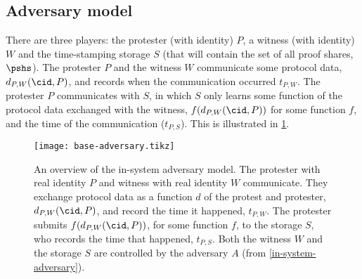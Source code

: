 \subsection{Adversary model}%
\label{formal-adversary-model}


There are three players: the protester (with identity) \(P\), a witness (with 
identity) \(W\) and the time-stamping storage \(S\) (that will contain the set 
of all proof shares, \(\pshs\)).
The protester \(P\) and the witness \(W\) communicate some protocol data,
\(d_{P,W}(\cid, P)\), and records when the communication occurred \(t_{P,W}\).
The protester \(P\) communicates with \(S\), in which \(S\) only learns some 
function of the protocol data exchanged with the witness, \(f(d_{P,W}(\cid, 
  P))\) for some function \(f\), and the time of the communication 
(\(t_{P,S}\)).
This is illustrated in \cref{fig:base-adversary}.

\begin{figure}
  \centering
  \texttt{[image: base-adversary.tikz]}
  \caption{\label{fig:base-adversary}%
    An overview of the in-system adversary model.
    The protester with real identity \(P\) and witness with real identity \(W\) 
    communicate.
    They exchange protocol data as a function \(d\) of the protest and protester, \(d_{P,W}(\cid, P)\), and record the time it 
    happened, \(t_{P,W}\).
    The protester submits \(f(d_{P,W}(\cid, P))\), for some function \(f\), to 
    the storage \(S\), who records the time that happened, \(t_{P,S}\).
    Both the witness \(W\) and the storage \(S\) are controlled by the adversary 
    \(A\) (from \cref{in-system-adversary}).
  }
\end{figure}

